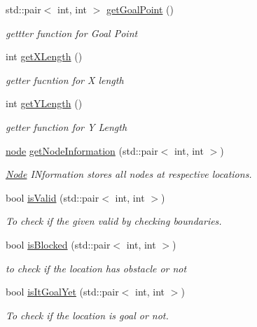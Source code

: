 \begin{DoxyCompactItemize}
std\+::pair$<$ int, int $>$ \hyperlink{classoptimalPlanner_a2cd6489e659be67503f007183cd8be05}{get\+Goal\+Point} ()
\begin{DoxyCompactList}\small\item\em gettter function for Goal Point \end{DoxyCompactList}\item 
int \hyperlink{classoptimalPlanner_a35486c87400cea9e455ef73246844a47}{get\+X\+Length} ()
\begin{DoxyCompactList}\small\item\em getter fucntion for X length \end{DoxyCompactList}\item 
int \hyperlink{classoptimalPlanner_afc7297bd9b3a207aedc7b8dd260b5270}{get\+Y\+Length} ()
\begin{DoxyCompactList}\small\item\em getter function for Y Length \end{DoxyCompactList}\item 
\hyperlink{structnode}{node} \hyperlink{classoptimalPlanner_a38869628f0c69e3a224de8730ca70bce}{get\+Node\+Information} (std\+::pair$<$ int, int $>$)
\begin{DoxyCompactList}\small\item\em \hyperlink{structNode}{Node} I\+Nformation stores all nodes at respective locations. \end{DoxyCompactList}\item 
bool \hyperlink{classoptimalPlanner_a0b4a2dcda06b4f230aae5fcd056270d8}{is\+Valid} (std\+::pair$<$ int, int $>$)
\begin{DoxyCompactList}\small\item\em To check if the given valid by checking boundaries. \end{DoxyCompactList}\item 
bool \hyperlink{classoptimalPlanner_affd923e57309f44ce1734b652b40103c}{is\+Blocked} (std\+::pair$<$ int, int $>$)
\begin{DoxyCompactList}\small\item\em to check if the location has obstacle or not \end{DoxyCompactList}\item 
bool \hyperlink{classoptimalPlanner_aa8e96d238d9d57f486453816d221df25}{is\+It\+Goal\+Yet} (std\+::pair$<$ int, int $>$)
\begin{DoxyCompactList}\small\item\em To check if the location is goal or not. \end{DoxyCompactList}\item 

\end{DoxyCompactItemize}
